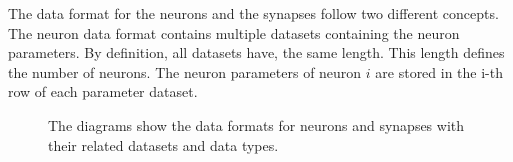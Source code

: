 The data format for the neurons and the synapses follow two different concepts.
The neuron data format contains multiple datasets containing the neuron parameters.
By definition, all datasets have, the same length. This length defines the number of neurons.
The neuron parameters of neuron $i$ are stored in the i-th row of each parameter dataset.
\begin{figure}[ht!]
   	\begin{center}
        \hspace{1cm}
    	   \end{center}
    	\caption{%
        The diagrams show the data formats for neurons and synapses with their related datasets and data types.
     }%
   \label{fig:file}
   \end{figure}
   

